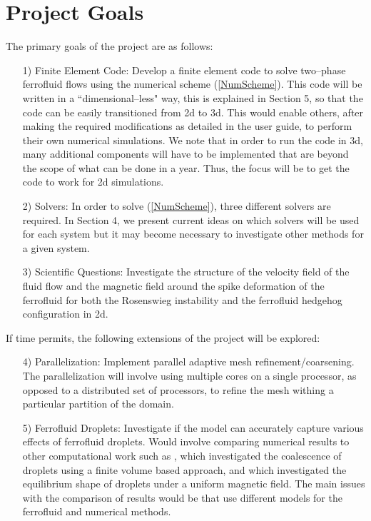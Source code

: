 \documentclass[11pt,fullpage]{article}
\theoremstyle{lemma}
\theoremstyle{definition}
\theoremstyle{lemma}
\begin{document}
\section{Project Goals}
The primary goals of the project are as follows:
\begin{itemize}
	\item[1)] Finite Element Code: Develop a finite element code to solve two--phase ferrofluid flows using the numerical scheme (\ref{NumScheme}). This code will be written in a ``dimensional--less" way, this is explained in Section 5, so that the code can be easily transitioned from 2d to 3d. This would enable others, after making the required modifications as detailed in the user guide, to perform their own numerical simulations. We note that in order to run the code in 3d, many additional components will have to be implemented that are beyond the scope of what can be done in a year. Thus, the focus will be to get the code to work for 2d simulations.
	
	\item[2)] Solvers: In order to solve (\ref{NumScheme}), three different solvers are required. In Section 4, we present current ideas on which solvers will be used for each system but it may become necessary to investigate other methods for a given system.
	
	\item[3)] Scientific Questions: Investigate the structure of the velocity field of the fluid flow and the magnetic field around the spike deformation of the ferrofluid for both the Rosenswieg instability and the ferrofluid hedgehog configuration in 2d.
\end{itemize}
If time permits, the following extensions of the project will be explored:
\begin{itemize}
	\item[4)] Parallelization: Implement parallel adaptive mesh refinement/coarsening. The parallelization will involve using multiple cores on a single processor, as opposed to a distributed set of processors, to refine the mesh withing a particular partition of the domain.
	
	\item[5)] Ferrofluid Droplets: Investigate if the model can accurately capture various effects of ferrofluid droplets. Would involve comparing numerical results to other computational work such as \cite{CompDropplet}, which investigated the coalescence of droplets using a finite volume based approach, and \cite{DroppletDeform} which investigated the equilibrium shape of droplets under a uniform magnetic field. The main issues with the comparison of results would be that \cite{CompDropplet, DroppletDeform} use different models for the ferrofluid and numerical methods.
\end{itemize}
\end{document}
